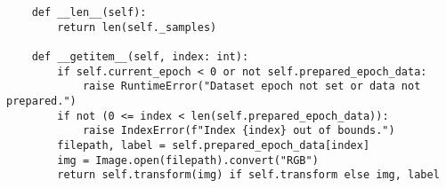 \begin{lstlisting}
    def __len__(self):
        return len(self._samples)

    def __getitem__(self, index: int):
        if self.current_epoch < 0 or not self.prepared_epoch_data:
            raise RuntimeError("Dataset epoch not set or data not prepared.")
        if not (0 <= index < len(self.prepared_epoch_data)):
            raise IndexError(f"Index {index} out of bounds.")
        filepath, label = self.prepared_epoch_data[index]
        img = Image.open(filepath).convert("RGB")
        return self.transform(img) if self.transform else img, label
\end{lstlisting}
